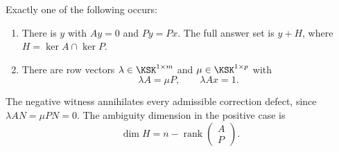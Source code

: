 \begin{KSproposition}\label{KS:KS57}
Exactly one of the following occurs:
\begin{enumerate}
\item There is \(y\) with \(Ay=0\) and \(Py=Px\). The full answer set is \(y+H\), where \(H=\ker A\cap\ker P\).
\item There are row vectors \(\lambda\in\KSK^{1\times m}\) and \(\mu\in\KSK^{1\times p}\) with
\[
 \lambda A=\mu P,\qquad\lambda Ax=1.
\]
\end{enumerate}
The negative witness annihilates every admissible correction defect, since \(\lambda AN=\mu PN=0\). The ambiguity dimension in the positive case is
\[
 \dim H=n-\operatorname{rank}\begin{pmatrix}A\\P\end{pmatrix}.
\]
\end{KSproposition}
